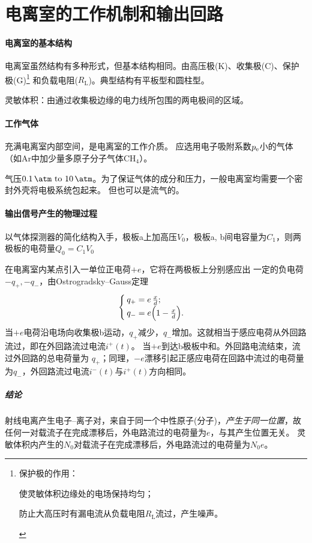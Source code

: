 \section{电离室的工作机制和输出回路}

\paragraph{电离室的基本结构}
电离室虽然结构有多种形式，但基本结构相同。由高压极(K)、收集极(C)、保护极(G)\footnote{
	保护极的作用：
	\begin{compactenum}
		\item 使灵敏体积边缘处的电场保持均匀；
		\item 防止大高压时有漏电流从负载电阻$R_{\mathrm{L}}$流过，产生噪声。
	\end{compactenum}
}
和负载电阻($R_{\mathrm{L}}$)。典型结构有平板型和圆柱型。



灵敏体积：由通过收集极边缘的电力线所包围的两电极间的区域。
\paragraph{工作气体}
充满电离室内部空间，是电离室的工作介质。
应选用电子吸附系数$p_{\mathrm{e}}$小的气体（如Ar中加少量多原子分子气体CH$_4$）。

气压$\qtyrange{0.1}{10}{\atm}$。为了保证气体的成分和压力，一般电离室均需要一个密封外壳将电极系统包起来。
但也可以是流气的。
\paragraph{输出信号产生的物理过程}
以气体探测器的简化结构入手，极板a上加高压$V_0$，极板a, b间电容量为$C_1$，则两极板的电荷量$Q_0 = C_1V_0$

\begin{notecaptionblock}
\end{notecaptionblock}
在电离室内某点引入一单位正电荷$+e$，它将在两极板上分别感应出
一定的负电荷$-q_+,-q_-$，由Ostrogradsky--Gauss定理
\begin{equation}\label{eq:nrd-plate-induced-charges}
	\begin{cases}
		q_+ = e\,\frac xd;\\
		q_- = e\Bigl(1 - \frac xd\Bigr).
	\end{cases}
\end{equation}
当$+e$电荷沿电场向收集极b运动，$q_+$减少，$q_-$增加。这就相当于感应电荷从外回路流过，即在外回路流过电流$i^+(t)$。
当$+e$到达b极板中和。外回路电流结束，流过外回路的总电荷量为  $q_+$；同理，$-e$漂移引起正感应电荷在回路中流过的电荷量为$q_-$，外回路流过电流$i^-(t)$与$i^+(t)$方向相同。
\subparagraph{结论}
射线电离产生电子--离子对，来自于同一个中性原子(分子)，\textit{产生于同一位置}，故任何一对载流子在完成漂移后，外电路流过的电荷量为$e$，与其产生位置无关。
灵敏体积内产生的$N_0$对载流子在完成漂移后，外电路流过的电荷量为$N_0e$。


